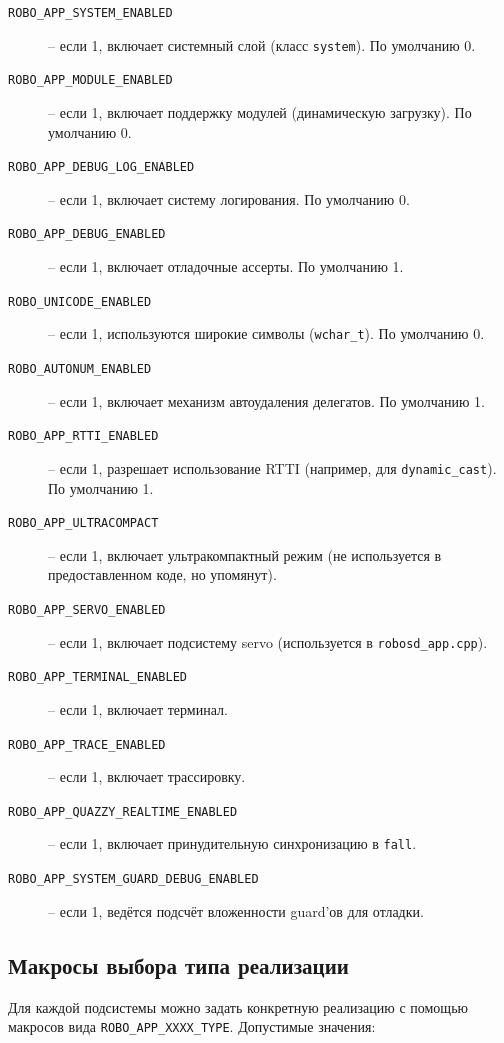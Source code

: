 \documentclass[a4paper,12pt]{article}
\begin{document}
\begin{description}
    \item[\texttt{ROBO\_APP\_SYSTEM\_ENABLED}] -- если 1, включает системный слой (класс \texttt{system}). По умолчанию 0.
    \item[\texttt{ROBO\_APP\_MODULE\_ENABLED}] -- если 1, включает поддержку модулей (динамическую загрузку). По умолчанию 0.
    \item[\texttt{ROBO\_APP\_DEBUG\_LOG\_ENABLED}] -- если 1, включает систему логирования. По умолчанию 0.
    \item[\texttt{ROBO\_APP\_DEBUG\_ENABLED}] -- если 1, включает отладочные ассерты. По умолчанию 1.
    \item[\texttt{ROBO\_UNICODE\_ENABLED}] -- если 1, используются широкие символы (\texttt{wchar\_t}). По умолчанию 0.
    \item[\texttt{ROBO\_AUTONUM\_ENABLED}] -- если 1, включает механизм автоудаления делегатов. По умолчанию 1.
    \item[\texttt{ROBO\_APP\_RTTI\_ENABLED}] -- если 1, разрешает использование RTTI (например, для \texttt{dynamic\_cast}). По умолчанию 1.
    \item[\texttt{ROBO\_APP\_ULTRACOMPACT}] -- если 1, включает ультракомпактный режим (не используется в предоставленном коде, но упомянут).
    \item[\texttt{ROBO\_APP\_SERVO\_ENABLED}] -- если 1, включает подсистему servo (используется в \texttt{robosd\_app.cpp}).
    \item[\texttt{ROBO\_APP\_TERMINAL\_ENABLED}] -- если 1, включает терминал.
    \item[\texttt{ROBO\_APP\_TRACE\_ENABLED}] -- если 1, включает трассировку.
    \item[\texttt{ROBO\_APP\_QUAZZY\_REALTIME\_ENABLED}] -- если 1, включает принудительную синхронизацию в \texttt{fall}.
    \item[\texttt{ROBO\_APP\_SYSTEM\_GUARD\_DEBUG\_ENABLED}] -- если 1, ведётся подсчёт вложенности guard'ов для отладки.
\end{description}

\subsection{Макросы выбора типа реализации}

Для каждой подсистемы можно задать конкретную реализацию с помощью макросов вида \texttt{ROBO\_APP\_XXXX\_TYPE}. Допустимые значения:
\end{document}

